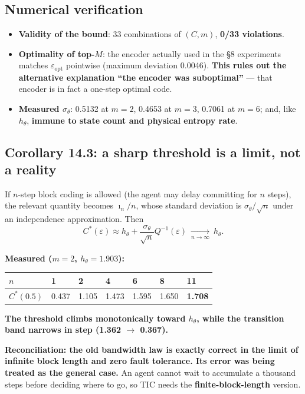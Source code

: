 \documentclass[11pt]{article}
\providecommand{\tightlist}{%
  \setlength{\itemsep}{0pt}\setlength{\parskip}{0pt}}
\renewenvironment{quote}
  {\def\FrameCommand{{\color{gray!60}\vrule width 2pt}\hspace{8pt}}%
   \MakeFramed{\advance\hsize-\width \FrameRestore}\begin{itshape}}
  {\end{itshape}\endMakeFramed}
\begin{document}
\hypertarget{numerical-verification}{%
\subsection{Numerical verification}\label{numerical-verification}}

\begin{itemize}
\tightlist
\item
  \textbf{Validity of the bound}: 33 combinations of \((C,m)\), \textbf{0/33 violations}.
\item
  \textbf{Optimality of top-\(M\)}: the encoder actually used in the \S{}8 experiments matches \(\varepsilon_{\mathrm{opt}}\) pointwise (maximum deviation 0.0046). \textbf{This rules out the alternative explanation ``the encoder was suboptimal''} --- that encoder is in fact a one-step optimal code.
\item
  \textbf{Measured \(\sigma_\theta\)}: 0.5132 at \(m=2\), 0.4653 at \(m=3\), 0.7061 at \(m=6\); and, like \(h_\theta\), \textbf{immune to state count and physical entropy rate}.
\end{itemize}

\hypertarget{corollary-14.3-a-sharp-threshold-is-a-limit-not-a-reality}{%
\subsection{Corollary 14.3: a sharp threshold is a limit, not a reality}\label{corollary-14.3-a-sharp-threshold-is-a-limit-not-a-reality}}

If \(n\)-step block coding is allowed (the agent may delay committing for \(n\) steps), the relevant quantity becomes \(\imath_n/n\), whose standard deviation is \(\sigma_\theta/\sqrt n\) under an independence approximation. Then
\[C^*(\varepsilon)\approx h_\theta+\frac{\sigma_\theta}{\sqrt n}Q^{-1}(\varepsilon)\ \xrightarrow[n\to\infty]{}\ h_\theta.\]

\textbf{Measured (\(m=2\), \(h_\theta=1.903\)):}

\begin{longtable}[]{@{}lllllll@{}}
\toprule
\(n\) & 1 & 2 & 4 & 6 & 8 & 11\tabularnewline
\midrule
\endhead
\(C^*(0.5)\) & 0.437 & 1.105 & 1.473 & 1.595 & 1.650 & \textbf{1.708}\tabularnewline
\bottomrule
\end{longtable}

\textbf{The threshold climbs monotonically toward \(h_\theta\), while the transition band narrows in step (1.362 \(\rightarrow\) 0.367).}

\begin{quote}
\textbf{Reconciliation: the old bandwidth law is exactly correct in the limit of infinite block length and zero fault tolerance. Its error was being treated as the general case.} An agent cannot wait to accumulate a thousand steps before deciding where to go, so TIC needs the \textbf{finite-block-length} version.
\end{quote}
\end{document}

